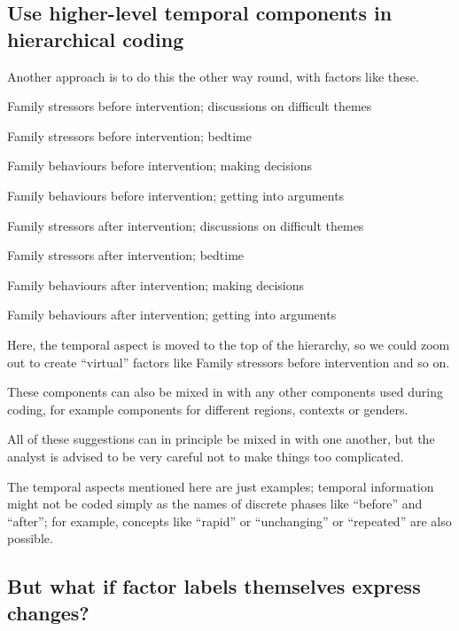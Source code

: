 \documentclass[
]{book}
\begin{document}
\hypertarget{use-higher-level-temporal-components-in-hierarchical-coding}{%
\subsection{Use higher-level temporal components in hierarchical coding}\label{use-higher-level-temporal-components-in-hierarchical-coding}}

Another approach is to do this the other way round, with factors like these.

Family stressors before intervention; discussions on difficult themes

Family stressors before intervention; bedtime

Family behaviours before intervention; making decisions

Family behaviours before intervention; getting into arguments

Family stressors after intervention; discussions on difficult themes

Family stressors after intervention; bedtime

Family behaviours after intervention; making decisions

Family behaviours after intervention; getting into arguments

Here, the temporal aspect is moved to the top of the hierarchy, so we could zoom out to create ``virtual'' factors like Family stressors before intervention and so on.

These components can also be mixed in with any other components used during coding, for example components for different regions, contexts or genders.

All of these suggestions can in principle be mixed in with one another, but the analyst is advised to be very careful not to make things too complicated.

The temporal aspects mentioned here are just examples; temporal information might not be coded simply as the names of discrete phases like ``before'' and ``after''; for example, concepts like ``rapid'' or ``unchanging'' or ``repeated'' are also possible.

\hypertarget{but-what-if-factor-labels-themselves-express-changes}{%
\subsection{But what if factor labels themselves express changes?}\label{but-what-if-factor-labels-themselves-express-changes}}
\end{document}
